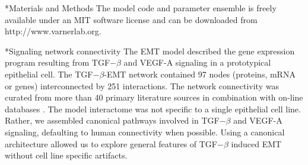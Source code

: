 \documentclass[12pt]{article}
\makeatletter
\renewcommand\subsection{\@startsection
	{subsection}{2}{0mm}
	{-0.05in}
	{-0.5\baselineskip}
	{\normalfont\normalsize\bfseries}}
\renewcommand\section{\@startsection
	{subsection}{2}{0mm}
	{-0.2in}
	{0.05\baselineskip}
	{\normalfont\large\bfseries}}
\makeatother
\begin{document}
\clearpage

\section*{Materials and Methods}
The model code and parameter ensemble is freely available under an MIT software license and can be downloaded from http://www.varnerlab.org.

\subsection*{Signaling network connectivity}
The EMT model described the gene expression program resulting from TGF$-\beta$ and VEGF-A signaling in a prototypical epithelial cell.
The TGF$-\beta$-EMT network contained 97 nodes (proteins, mRNA or genes) interconnected by 251 interactions.
The network connectivity was curated from more than 40 primary literature sources in combination with on-line databases \citep{Linding:2007fk,Jensen:2009fk}.
The model interactome was not specific to a single epithelial cell line.
Rather, we assembled canonical pathways involved in TGF$-\beta$ and VEGF-A signaling, defaulting to human connectivity when possible.
Using a canonical architecture allowed us to explore general features of TGF$-\beta$ induced EMT without cell line specific artifacts.
\end{document}
